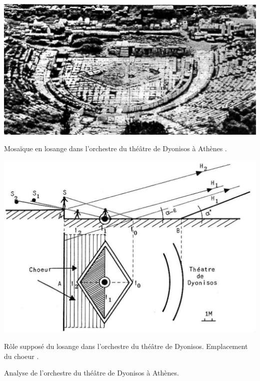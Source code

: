 \begin{figureth}
	\begin{subfigureth}{0.48\textwidth}
		\includegraphics[width=\linewidth]{images/dyonisos1}
		\caption[Mosaïque en losange dans l'orchestre du théâtre de Dyonisos à Athènes.]{Mosaïque en losange dans l'orchestre du théâtre de Dyonisos à Athènes \footnotemark.}
		\label{dyonisos1}
		\hfill
		\quad
	\end{subfigureth}
	\quad
	\begin{subfigureth}{0.48\textwidth}
		\includegraphics[width=\linewidth]{images/dyonisos2}
		\caption[Rôle supposé du losange dans l'orchestre du théâtre de Dyonisos. Emplacement du choeur.]{Rôle supposé du losange dans l'orchestre du théâtre de Dyonisos. Emplacement du choeur \footnotemark.}
		\label{dyonisos2}
		\quad
	\end{subfigureth} 
\caption{Analyse de l'orchestre du théâtre de Dyonisos à Athènes.}	
\label{dyonisos}
\end{figureth}	
\addtocounter{footnote}{-1}
